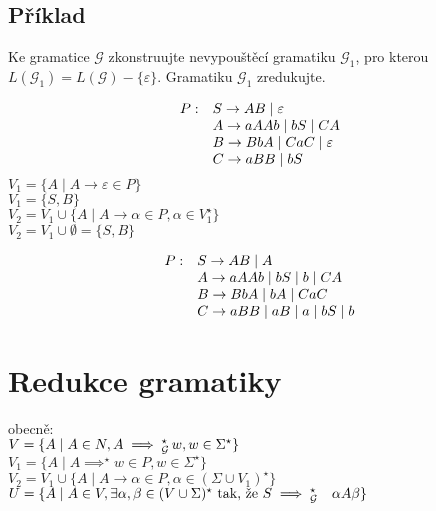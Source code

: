 \subsection{Příklad}\noindent %
Ke gramatice $\mathcal{G}$ zkonstruujte nevypouštěcí gramatiku $\mathcal{G}_1$, pro kterou 
$L(\mathcal{G}_1) = L(\mathcal{G}) - \{\varepsilon\}$. Gramatiku $\mathcal{G}_1$ zredukujte.

\[
    \begin{array}{l l}
        P: & S \rightarrow AB \mid \varepsilon \\
           & A \rightarrow aAAb \mid bS \mid CA \\
           & B \rightarrow BbA \mid CaC \mid \varepsilon\\
           & C \rightarrow aBB \mid bS \\
    \end{array}
\]
$V_1 = \{A \mid A \rightarrow \varepsilon \in P\}$\\
$V_1 = \{S, B\}$\\
$V_2 = V_1 \cup \{A \mid A \rightarrow \alpha \in P, \alpha \in V_1^{\star}\}$\\
$V_2 = V_1 \cup \emptyset = \{S, B\}$

\[
    \begin{array}{l l}
        P: & S \rightarrow AB \mid A \\
           & A \rightarrow aAAb \mid bS \mid b \mid CA \\
           & B \rightarrow BbA \mid bA \mid CaC \\
           & C \rightarrow aBB \mid aB \mid a \mid bS \mid b \\
    \end{array}
\]


\LARGE {} %
\normalsize
\section*{Redukce gramatiky}
obecně: \\
$V = \{A \mid A \in N, A \implies_{\mathcal{G}}^{\star} \, w, w \in \Sigma^{\star}\}$\\
$V_1 = \{A \mid A \implies^{\star} w \in P, w \in \Sigma^{\star}\}$\\
$V_2 = V_1 \cup \{A \mid A \rightarrow \alpha \in P, \alpha \in (\Sigma \cup V_1)^{\star}\}$\\
$U = \{A \mid A \in V, \exists \alpha, \beta\in (V \cup \Sigma)^{\star} \text{ tak, že } S 
\implies^{\star}_{\mathcal{G}} \quad \alpha A \beta\}$

